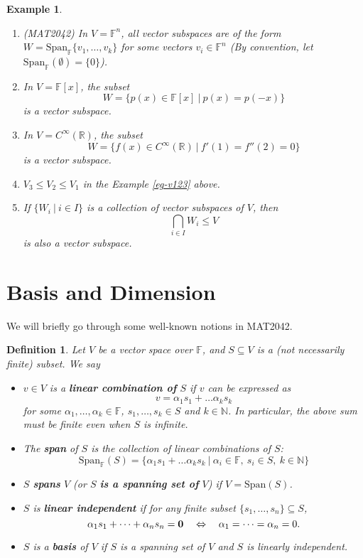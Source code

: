 \documentclass[12pt]{amsbook}
\newtheorem{definition}[theorem]{Definition}
\newtheorem{example}[theorem]{Example}
\begin{document}
\begin{example} \
    \begin{enumerate}
        \item (MAT2042) In $V = \mathbb{F}^n$, all vector subspaces are of the form $W = \mathrm{Span}_{\mathbb{F}}\{v_1, \dots, v_k\}$ for some vectors $v_i \in \mathbb{F}^n$ (By convention, let $\mathrm{Span}_{\mathbb{F}}(\emptyset)=\{0\}$).
        \item In $V = \mathbb{F}[x]$, the subset 
        $$W = \{p(x) \in \mathbb{F}[x]\ |\ p(x) = p(-x)\}$$ 
        is a vector subspace.
        \item In $V = C^{\infty}(\mathbb{R})$, the subset 
        $$W = \{f(x) \in C^{\infty}(\mathbb{R}) \ |\ f'(1) = f''(2) = 0\}$$ 
        is a vector subspace.
        \item $V_3 \leq V_2 \leq V_1$ in the Example \ref{eg-v123} above.
        \item If $\{W_i\ |\ i \in I\}$ is a collection of vector subspaces of $V$, then $$\bigcap_{i \in I} W_i \leq V$$ is also a vector subspace.
    \end{enumerate}
\end{example}

\section{Basis and Dimension}
We will briefly go through some well-known notions in MAT2042.

\begin{definition}\label{vspace-notions}
    Let $V$ be a vector space over $\mathbb{F}$, and $S \subseteq V$ is a (not necessarily finite) subset. We say
    \begin{itemize}
        \item $v \in V$ is a {\bf linear combination of} $S$ if $v$ can be expressed as
        $$v = \alpha_1 s_1 + \dots \alpha_k s_k$$
        for some $\alpha_1, \dots, \alpha_k \in \mathbb{F}$, $s_1, \dots, s_k \in S$ and $k \in \mathbb{N}$. In particular, the above sum must be finite even when $S$ is infinite.
        \item The {\bf span} of $S$ is the collection of linear combinations of $S$:
        $$\mathrm{Span}_{\mathbb{F}}(S) = \{\alpha_1 s_1 + \dots \alpha_k s_k\ |\ \alpha_i \in \mathbb{F},\ s_i \in S,\ k \in \mathbb{N}\}$$
        \item $S$ {\bf spans} $V$ (or $S$ {\bf is a spanning set of} $V$) if $V = \mathrm{Span}(S)$.
        \item $S$ is {\bf linear independent} if for {\it any} finite subset 
        $\{s_1, \dots, s_n\} \subseteq S$, 
        $$\alpha_1s_1 + \dots + \alpha_ns_n = {\bf 0} \quad \Leftrightarrow \quad \alpha_1 = \dots = \alpha_n = 0.$$
        \item $S$ is a {\bf basis} of $V$ if $S$ is a spanning set of $V$ and $S$ is linearly independent.
    \end{itemize}
\end{definition}
\end{document}
